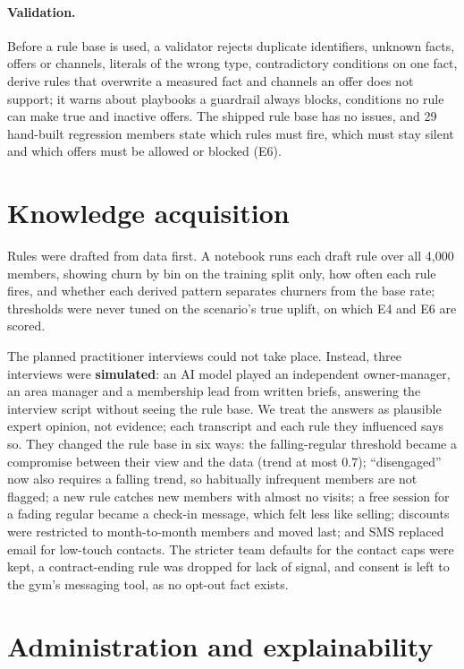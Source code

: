 \paragraph{Validation.} Before a rule base is used, a validator rejects duplicate identifiers, unknown facts, offers or channels, literals of the wrong type, contradictory conditions on one fact, derive rules that overwrite a measured fact and channels an offer does not support; it warns about playbooks a guardrail always blocks, conditions no rule can make true and inactive offers. The shipped rule base has no issues, and 29 hand-built regression members state which rules must fire, which must stay silent and which offers must be allowed or blocked (E6).

\section{Knowledge acquisition}
\label{sec:acquisition}

Rules were drafted from data first. A notebook runs each draft rule over all 4,000 members, showing churn by bin on the training split only, how often each rule fires, and whether each derived pattern separates churners from the base rate; thresholds were never tuned on the scenario's true uplift, on which E4 and E6 are scored.

The planned practitioner interviews could not take place. Instead, three interviews were \textbf{simulated}: an AI model played an independent owner-manager, an area manager and a membership lead from written briefs, answering the interview script without seeing the rule base. We treat the answers as plausible expert opinion, not evidence; each transcript and each rule they influenced says so. They changed the rule base in six ways: the falling-regular threshold became a compromise between their view and the data (trend at most 0.7); \enquote{disengaged} now also requires a falling trend, so habitually infrequent members are not flagged; a new rule catches new members with almost no visits; a free session for a fading regular became a check-in message, which felt less like selling; discounts were restricted to month-to-month members and moved last; and SMS replaced email for low-touch contacts. The stricter team defaults for the contact caps were kept, a contract-ending rule was dropped for lack of signal, and consent is left to the gym's messaging tool, as no opt-out fact exists.

\section{Administration and explainability}

